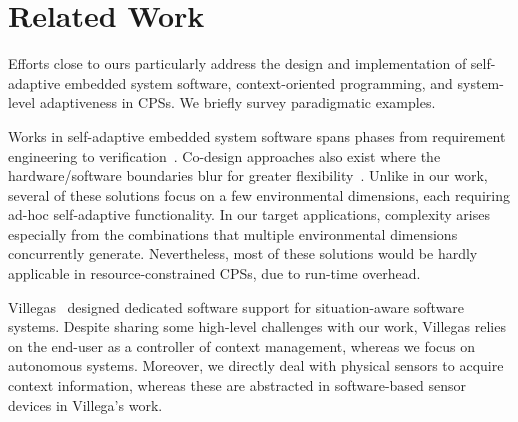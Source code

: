 \section{Related Work}
\label{sec:related}

Efforts close to ours particularly address the design and
implementation of self-adaptive embedded system software,
context-oriented programming, and system-level adaptiveness in
CPSs. We briefly survey paradigmatic examples.

Works in self-adaptive embedded system software
spans phases from requirement engineering to
verification~\cite{cheng:adaptive}. Co-design approaches also exist
where the hardware/software boundaries blur for greater
flexibility~\cite{diguet11:closed}. Unlike in our work, several of
these solutions focus on a few environmental dimensions, each
requiring ad-hoc self-adaptive functionality. In our target
applications, complexity arises especially from the 
combinations that multiple environmental dimensions concurrently
generate. Nevertheless, most of these solutions would be hardly
applicable in resource-constrained CPSs, due to
run-time overhead.

Villegas~\cite{VilegasPhD13} designed dedicated software support for
situation-aware software systems. Despite sharing some high-level
challenges with our work, Villegas relies on the end-user as a
controller of context management, whereas we focus on autonomous
systems. Moreover, we directly deal with physical sensors to acquire
context information, whereas these are abstracted in software-based
sensor devices in Villega's work.


